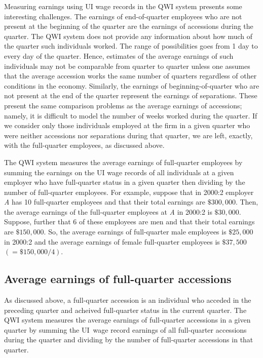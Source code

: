 Measuring earnings using UI wage records in the QWI system presents
some interesting challenges. The earnings of end-of-quarter employees who
are not present at the beginning of the quarter are the earnings of
accessions during the quarter. The QWI system does not provide any
information about how much of the quarter such individuals worked. The range
of possibilities goes from 1 day to every day of the quarter. Hence,
estimates of the average earnings of such individuals may not be comparable
from quarter to quarter unless one assumes that the average accession works
the same number of quarters regardless of other conditions in the economy.
Similarly, the earnings of beginning-of-quarter who are not present at the
end of the quarter represent the earnings of separations. These present the
same comparison problems as the average earnings of accessions; namely, it
is difficult to model the number of weeks worked during the quarter. If we
consider only those individuals employed at the firm in a given quarter who
were neither accessions nor separations during that quarter, we are left,
exactly, with the full-quarter employees, as discussed above.

The QWI system measures the average earnings of full-quarter employees by
summing the earnings on the {UI} wage records of all individuals at a
given employer who have full-quarter status in a given quarter then dividing
by the number of full-quarter employees. For example, suppose that in 2000:2
employer \textit{A} has 10 full-quarter employees and that their total
earnings are $\$300,000.$ Then, the average earnings of the full-quarter
employees at \textit{A} in 2000:2 is $\$30,000.$ Suppose, further that 6 of
these employees are men and that their total earnings are $\$150,000$. So,
the average earnings of full-quarter male employees is $\$25,000$ in 2000:2
and the average earnings of female full-quarter employees is $\$37,500$ $%
\left( =\$150,000/4\right) $.

\subsection{Average earnings of full-quarter accessions}


As discussed above, a full-quarter accession is an individual who acceded in
the preceding quarter and acheived full-quarter status in the current
quarter. The QWI system measures the average earnings of full-quarter
accessions in a given quarter by summing the UI\ wage record
earnings of all full-quarter accessions during the quarter and dividing by
the number of full-quarter accessions in that quarter.

